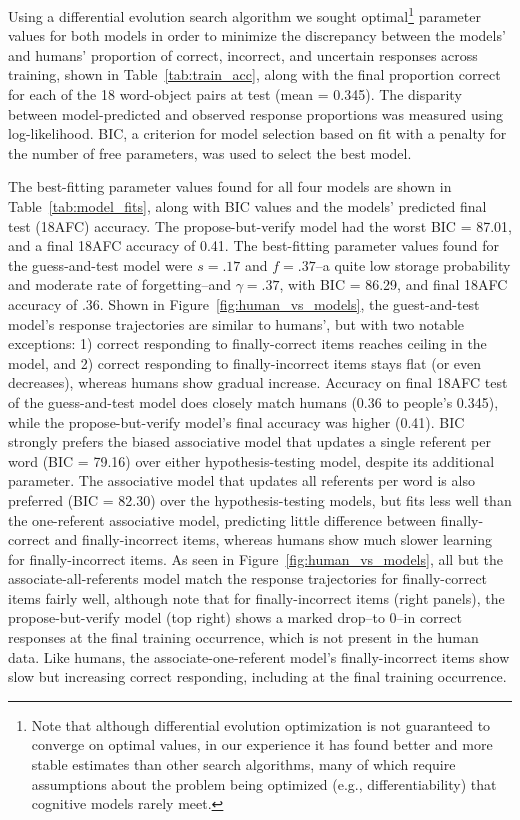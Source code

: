 \documentclass[man,floatsintext]{apa6}
\begin{document}
Using a differential evolution search algorithm \citep{deoptim} we sought optimal\footnote{Note that although differential evolution  optimization is not guaranteed to converge on optimal values, in our experience it has found better and more stable estimates than other search algorithms, many of which require assumptions about the problem being optimized (e.g., differentiability) that cognitive models rarely meet.} parameter values for both models in order to minimize the discrepancy between the models' and humans' proportion of correct, incorrect, and uncertain responses across training, shown in Table~\ref{tab:train_acc}, along with the final proportion correct for each of the 18 word-object pairs at test (mean = 0.345).
The disparity between model-predicted and observed response proportions was measured using log-likelihood. BIC, a criterion for model selection based on fit with a penalty for the number of free parameters, was used to select the best model.

The best-fitting parameter values found for all four models are shown in Table~\ref{tab:model_fits}, along with BIC values and the models' predicted final test (18AFC) accuracy.
The propose-but-verify model had the worst BIC = 87.01, and a final 18AFC accuracy of 0.41. The best-fitting parameter values found for the guess-and-test model were $s = .17$ and $f = .37$--a quite low storage probability and moderate rate of forgetting--and $\gamma = .37$, with BIC = 86.29, and final 18AFC accuracy of .36. Shown in Figure~\ref{fig:human_vs_models}, the guest-and-test model's response trajectories are similar to humans', but with two notable exceptions: 1) correct responding to finally-correct items reaches ceiling in the model, and 2) correct responding to finally-incorrect items stays flat (or even decreases), whereas humans show gradual increase. Accuracy on final 18AFC test of the guess-and-test model does closely match humans (0.36 to people's 0.345), while the propose-but-verify model's final accuracy was higher (0.41).
BIC strongly prefers the biased associative model that updates a single referent per word (BIC = 79.16) over either hypothesis-testing model, despite its additional parameter. The associative model that updates all referents per word is also preferred (BIC = 82.30) over the hypothesis-testing models, but fits less well than the one-referent associative model, predicting little difference between finally-correct and finally-incorrect items, whereas humans show much slower learning for finally-incorrect items.
As seen in Figure~\ref{fig:human_vs_models}, all but the associate-all-referents model match the response trajectories for finally-correct items fairly well, although note that for finally-incorrect items (right panels), the propose-but-verify model (top right) shows a marked drop--to 0--in correct responses at the final training occurrence, which is not present in the human data. Like humans, the associate-one-referent model's finally-incorrect items show slow but increasing correct responding, including at the final training occurrence. 
\end{document}
